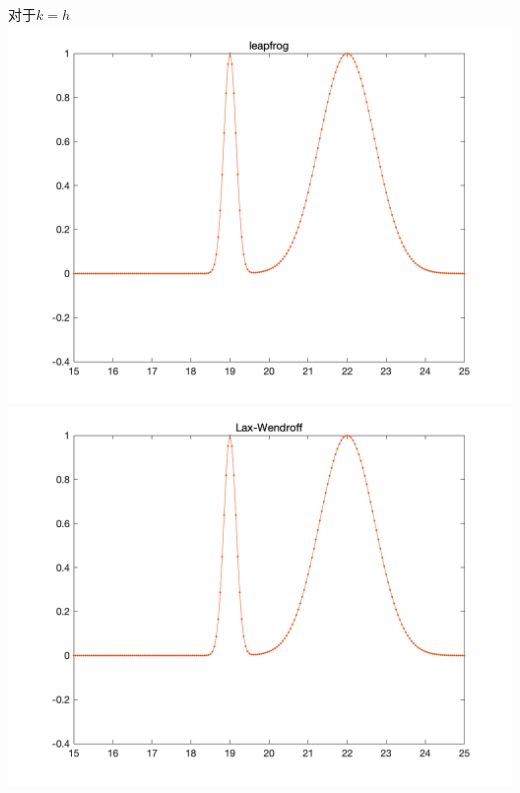 \documentclass{article}
\begin{document}
对于$k=h$\\
\includegraphics[scale = 0.175]{leapfrog1.png}
\includegraphics[scale = 0.175]{Lax_Wendroff1.png}
\end{document}
